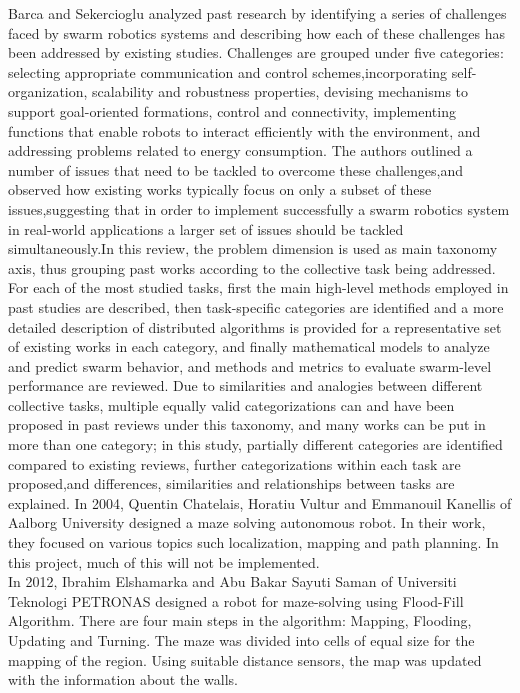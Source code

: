 Barca and Sekercioglu\cite{thirteen} analyzed past research by identifying a series of challenges faced by swarm robotics systems and describing how each of these challenges has been addressed by existing studies. Challenges are grouped under five categories: selecting appropriate communication and control schemes,incorporating self-organization, scalability and robustness properties, devising mechanisms to support goal-oriented formations, control and connectivity, implementing functions that enable robots to interact efficiently with the environment, and addressing problems related to energy consumption. The authors outlined a number of issues that need to be tackled to overcome these challenges,and observed how existing works typically focus on only a subset of these issues,suggesting that in order to implement successfully a swarm robotics system in real-world applications a larger set of issues should be tackled simultaneously.In this review, the problem dimension is used as main taxonomy axis, thus grouping past works according to the collective task being addressed. For each of the most studied tasks, first the main high-level methods employed in past studies are described, then task-specific categories are identified and a more detailed description of distributed algorithms is provided for a representative set of existing works in each category, and finally mathematical models to analyze and predict swarm behavior, and methods and metrics to evaluate swarm-level performance are reviewed. Due to similarities and analogies between different collective tasks, multiple equally valid categorizations can and have been proposed in past reviews under this taxonomy, and many works can be put in more than one category; in this study, partially different categories are identified compared to existing reviews, further categorizations within each task are proposed,and differences, similarities and relationships between tasks are explained.
In 2004, Quentin Chatelais, 
Horatiu Vultur and 
Emmanouil Kanellis of Aalborg University designed a maze solving autonomous robot. In their work, they focused on various topics such localization, mapping and path planning. In this project, much of this will not be implemented. \\
In 2012, Ibrahim Elshamarka and Abu Bakar Sayuti Saman of Universiti Teknologi PETRONAS designed a robot for maze-solving using Flood-Fill Algorithm. There are four main steps in the algorithm: Mapping, Flooding, Updating and Turning. The maze was divided into cells of equal size for the mapping of the region. Using suitable distance sensors, the map was updated with the information about the walls. \\
